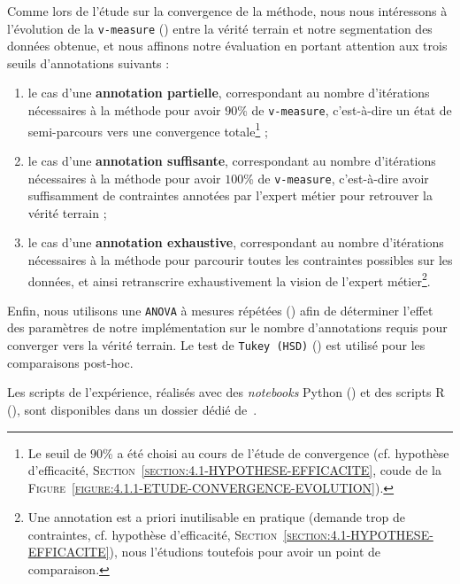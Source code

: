 			Comme lors de l'étude sur la convergence de la méthode, nous nous intéressons à l'évolution de la \texttt{v-measure} (\cite{rosenberg-hirschberg:2007:vmeasure-conditional-entropybased}) entre la vérité terrain et notre segmentation des données obtenue, et nous affinons notre évaluation en portant attention aux trois seuils d'annotations suivants :
			\begin{enumerate}
				\item le cas d'une \textbf{annotation partielle}, correspondant au nombre d'itérations nécessaires à la méthode pour avoir $90$\% de \texttt{v-measure}, c'est-à-dire un état de semi-parcours vers une convergence totale\footnote{Le seuil de $90$\% a été choisi au cours de l'étude de convergence (cf. hypothèse d'efficacité, \textsc{Section~\ref{section:4.1-HYPOTHESE-EFFICACITE}}, coude de la \textsc{Figure~\ref{figure:4.1.1-ETUDE-CONVERGENCE-EVOLUTION}}).} ;
				\item le cas d'une \textbf{annotation suffisante}, correspondant au nombre d'itérations nécessaires à la méthode pour avoir $100$\% de \texttt{v-measure}, c'est-à-dire avoir suffisamment de contraintes annotées par l'expert métier pour retrouver la vérité terrain ;
				\item le cas d'une \textbf{annotation exhaustive}, correspondant au nombre d'itérations nécessaires à la méthode pour parcourir toutes les contraintes possibles sur les données, et ainsi retranscrire exhaustivement la vision de l'expert métier\footnote{Une annotation est a priori inutilisable en pratique (demande trop de contraintes, cf. hypothèse d'efficacité, \textsc{Section~\ref{section:4.1-HYPOTHESE-EFFICACITE}}), nous l'étudions toutefois pour avoir un point de comparaison.}.
			\end{enumerate}
			
			Enfin, nous utilisons une \texttt{ANOVA} à mesures répétées (\cite{girden:1992:anova}) afin de déterminer l’effet des paramètres de notre implémentation sur le nombre d’annotations requis pour converger vers la vérité terrain. Le test de \texttt{Tukey (HSD)} (\cite{tukey:1949:comparing-individual-means}) est utilisé pour les comparaisons post-hoc.
			
			\begin{leftBarInformation}
				Les scripts de l'expérience, réalisés avec des \textit{notebooks} Python (\cite{van-rossum-drake:2009:python-reference-manual}) et des scripts R (\cite{r-core-team:2017:language-environment-statistical}), sont disponibles dans un dossier dédié de~\cite{schild:2021:cognitivefactory-interactiveclusteringcomparativestudy}.
			\end{leftBarInformation}

